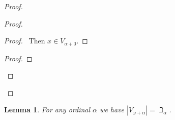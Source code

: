 \documentclass{article}
\let\qed\relax
\newtheorem{lemma}[axiom]{Lemma}
\theoremstyle{definition}
\begin{document}
    \begin{proof}
        \pf
        \begin{proof}
            \begin{proof}
                \pf\ Then $x \in V_{\alpha + 0}$.
            \end{proof}
            \begin{proof}
            \end{proof}
        \end{proof}
        \qed
    \end{proof}

    \begin{lemma}
        For any ordinal $\alpha$ we have $|V_{\omega + \alpha}| = \beth_\alpha$.
    \end{lemma}
\end{document}
